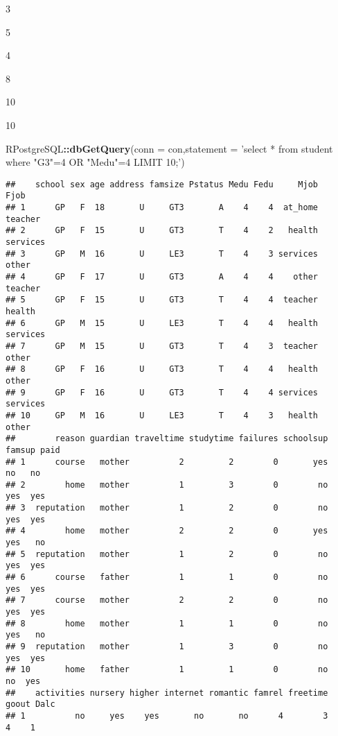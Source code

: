 \documentclass[]{book}
\newenvironment{Shaded}{\begin{snugshade}}{\end{snugshade}}
\newcommand{\KeywordTok}[1]{\textcolor[rgb]{0.13,0.29,0.53}{\textbf{#1}}}
\newcommand{\DataTypeTok}[1]{\textcolor[rgb]{0.13,0.29,0.53}{#1}}
\newcommand{\StringTok}[1]{\textcolor[rgb]{0.31,0.60,0.02}{#1}}
\newcommand{\OperatorTok}[1]{\textcolor[rgb]{0.81,0.36,0.00}{\textbf{#1}}}
\newcommand{\NormalTok}[1]{#1}
\begin{document}
3

5

4

8

10

10

\begin{Shaded}
\begin{Highlighting}[]
\NormalTok{RPostgreSQL}\OperatorTok{::}\KeywordTok{dbGetQuery}\NormalTok{(}\DataTypeTok{conn =}\NormalTok{ con,}\DataTypeTok{statement =} \StringTok{'select * from student where "G3"=4 OR "Medu"=4 LIMIT 10;'}\NormalTok{)}
\end{Highlighting}
\end{Shaded}

\begin{verbatim}
##    school sex age address famsize Pstatus Medu Fedu     Mjob     Fjob
## 1      GP   F  18       U     GT3       A    4    4  at_home  teacher
## 2      GP   F  15       U     GT3       T    4    2   health services
## 3      GP   M  16       U     LE3       T    4    3 services    other
## 4      GP   F  17       U     GT3       A    4    4    other  teacher
## 5      GP   F  15       U     GT3       T    4    4  teacher   health
## 6      GP   M  15       U     LE3       T    4    4   health services
## 7      GP   M  15       U     GT3       T    4    3  teacher    other
## 8      GP   F  16       U     GT3       T    4    4   health    other
## 9      GP   F  16       U     GT3       T    4    4 services services
## 10     GP   M  16       U     LE3       T    4    3   health    other
##        reason guardian traveltime studytime failures schoolsup famsup paid
## 1      course   mother          2         2        0       yes     no   no
## 2        home   mother          1         3        0        no    yes  yes
## 3  reputation   mother          1         2        0        no    yes  yes
## 4        home   mother          2         2        0       yes    yes   no
## 5  reputation   mother          1         2        0        no    yes  yes
## 6      course   father          1         1        0        no    yes  yes
## 7      course   mother          2         2        0        no    yes  yes
## 8        home   mother          1         1        0        no    yes   no
## 9  reputation   mother          1         3        0        no    yes  yes
## 10       home   father          1         1        0        no     no  yes
##    activities nursery higher internet romantic famrel freetime goout Dalc
## 1          no     yes    yes       no       no      4        3     4    1

\end{verbatim}
\end{document}
